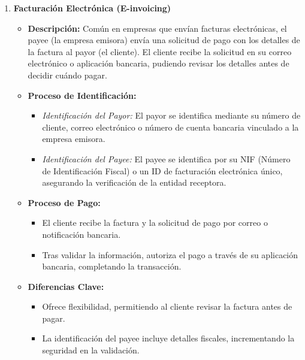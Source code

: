\begin{enumerate}
    \item \textbf{Facturación Electrónica (E-invoicing)}
    \begin{itemize}
        \item \textbf{Descripción:} Común en empresas que envían facturas electrónicas, el payee (la empresa emisora) envía una solicitud de pago con los detalles de la factura al payor (el cliente). El cliente recibe la solicitud en su correo electrónico o aplicación bancaria, pudiendo revisar los detalles antes de decidir cuándo pagar.
        \item \textbf{Proceso de Identificación:}
        \begin{itemize}
            \item \textit{Identificación del Payor:} El payor se identifica mediante su número de cliente, correo electrónico o número de cuenta bancaria vinculado a la empresa emisora.
            \item \textit{Identificación del Payee:} El payee se identifica por su NIF (Número de Identificación Fiscal) o un ID de facturación electrónica único, asegurando la verificación de la entidad receptora.
        \end{itemize}
        \item \textbf{Proceso de Pago:}
        \begin{itemize}
            \item El cliente recibe la factura y la solicitud de pago por correo o notificación bancaria.
            \item Tras validar la información, autoriza el pago a través de su aplicación bancaria, completando la transacción.
        \end{itemize}
        \item \textbf{Diferencias Clave:}
        \begin{itemize}
            \item Ofrece flexibilidad, permitiendo al cliente revisar la factura antes de pagar.
            \item La identificación del payee incluye detalles fiscales, incrementando la seguridad en la validación.
        \end{itemize}
    \end{itemize}


\end{enumerate}

